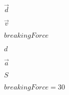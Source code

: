 \documentclass{article}
\begin{document}
$ \vec{d} $
\pagebreak

$ \vec{v} $
\pagebreak

$ breakingForce $
\pagebreak

$ d $
\pagebreak

$ \vec{a} $
\pagebreak

$ S $
\pagebreak

$ breakingForce = 30 $
\pagebreak
\end{document}
